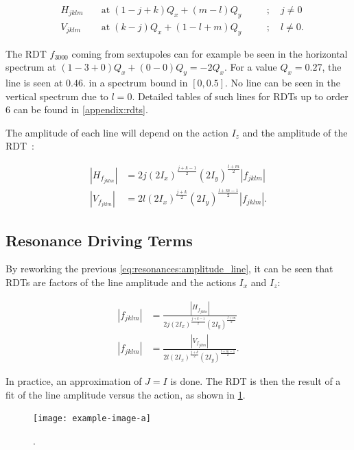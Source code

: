 \begin{equation}
    \begin{aligned}
    & H_{jklm} \;&&\text{at}\; (1 - j + k)Q_x + (m - l)Q_y \quad&&; \quad j \ne 0 \\
    & V_{jklm}   &&\text{at}\; (k - j)Q_x + (1 - l + m)Q_y      &&; \quad l \ne 0.
    \end{aligned}
    \label{eq:resonances:rdt_spectrum}
\end{equation}

The RDT $f_{3000}$ coming from sextupoles can for example be seen in the horizontal spectrum at
$(1-3+0)Q_x + (0-0)Q_y = -2Q_x$. For a value $Q_x = 0.27$, the line is seen at $0.46$. in a spectrum
bound in $[0, 0.5]$. No line can be seen in the vertical spectrum due to $l = 0$.
Detailed tables of such lines for RDTs up to order 6 can be found in \cref{appendix:rdts}.

The amplitude of each line will depend on the action $I_z$ and the amplitude of the
RDT~\cite{bartolini_normal_1997}:

\begin{equation}
    \begin{aligned}
    |H_{f_{jklm}}| &= 2 j (2 I_x)^\frac{j+k-1}{2} (2 I_y)^\frac{l+m}{2} |f_{jklm}| \\
    |V_{f_{jklm}}| &= 2 l (2 I_x)^\frac{j+k}{2} (2 I_y)^\frac{l+m-1}{2} |f_{jklm}|.
    \end{aligned}
    \label{eq:resonances:amplitude_line}
\end{equation}


\subsection{Resonance Driving Terms}

By reworking the previous \cref{eq:resonances:amplitude_line}, it can be seen that RDTs are factors
of the line amplitude and the actions $I_x$ and $I_z$:

\begin{equation}
    \begin{aligned}
    |f_{jklm}| &= \frac{|H_{f_{jklm}}|}{2 j (2 I_x)^\frac{j+k-1}{2} (2 I_y)^\frac{l+m}{2}} \\
    |f_{jklm}| &= \frac{|V_{f_{jklm}}|}{2 l (2 I_x)^\frac{j+k}{2} (2 I_y)^\frac{l+m-1}{2}} .
    \label{eq:resonances:amplitude_rdt}
    \end{aligned}
\end{equation}

In practice, an approximation of $J = I$ is done. The RDT is then the result of a fit of the line
amplitude versus the action, as shown in \cref{fig:resonances:fit_rdt}.

\begin{figure}[H]
    \centering
    \texttt{[image: example-image-a]}
    \caption{.}
    \label{fig:resonances:fit_rdt}
\end{figure}